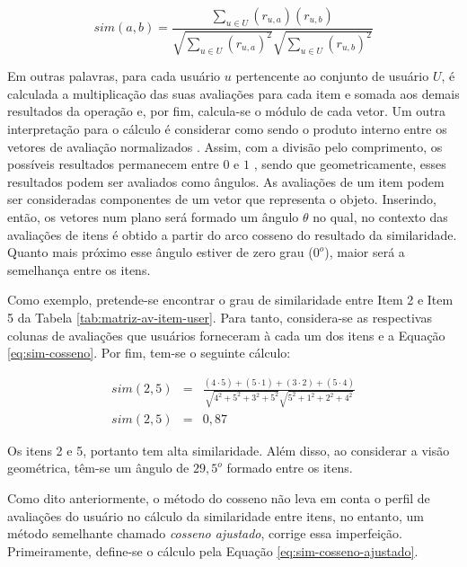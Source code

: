         \begin{equation} 
            sim(a, b) = \frac{\sum_{u\in U}(r_{u, a})(r_{u, b})}{\sqrt{\sum_{u\in U}(r_{u, a})^2}\sqrt{\sum_{u\in U}(r_{u, b})^2}} \label{eq:sim-cosseno}
        \end{equation}    
    
        Em outras palavras, para cada usuário $u$ pertencente ao conjunto de usuário $U$, é calculada a multiplicação das suas avaliações para cada item e somada aos demais resultados da operação e, por fim, calcula-se o módulo de cada vetor. Um outra interpretação para o cálculo é considerar como sendo o produto interno entre os vetores de avaliação normalizados \cite{Jones1987}. Assim, com a divisão pelo comprimento, os possíveis resultados permanecem entre $0$ e $1$ \cite{Jannach2010}, sendo que geometricamente, esses resultados podem ser avaliados como ângulos. As avaliações de um item podem ser consideradas componentes de um vetor que representa o objeto. Inserindo, então, os vetores num plano será formado um ângulo $\theta$ no qual, no contexto das avaliações de itens é obtido a partir do arco cosseno do resultado da similaridade. Quanto mais próximo esse ângulo estiver de zero grau ($0^o$), maior será a semelhança entre os itens.
        
        Como exemplo, pretende-se encontrar o grau de similaridade entre Item 2 e Item 5 da Tabela \ref{tab:matriz-av-item-user}. Para tanto, considera-se as respectivas colunas de avaliações que usuários forneceram à cada um dos itens e a Equação \ref{eq:sim-cosseno}. Por fim, tem-se o seguinte cálculo:
        
        \begin{eqnarray}
            sim(2, 5) &=& \frac{(4\cdot 5)+(5\cdot 1)+(3\cdot 2)+(5 \cdot 4)}{\sqrt{4^2+5^2+3^2+5^2}\sqrt{5^2+1^2+2^2+4^2}} \nonumber \\
            sim(2, 5) &=& 0,87 \nonumber
        \end{eqnarray}
        
        Os itens 2 e 5, portanto tem alta similaridade. Além disso, ao considerar a visão geométrica, têm-se um ângulo de $29,5^o$ formado entre os itens.
    
        Como dito anteriormente, o método do cosseno não leva em conta o perfil de avaliações do usuário no cálculo da similaridade entre itens, no entanto, um método semelhante chamado \textit{cosseno ajustado}, corrige essa imperfeição. Primeiramente, define-se o cálculo pela Equação \ref{eq:sim-cosseno-ajustado}.
        
